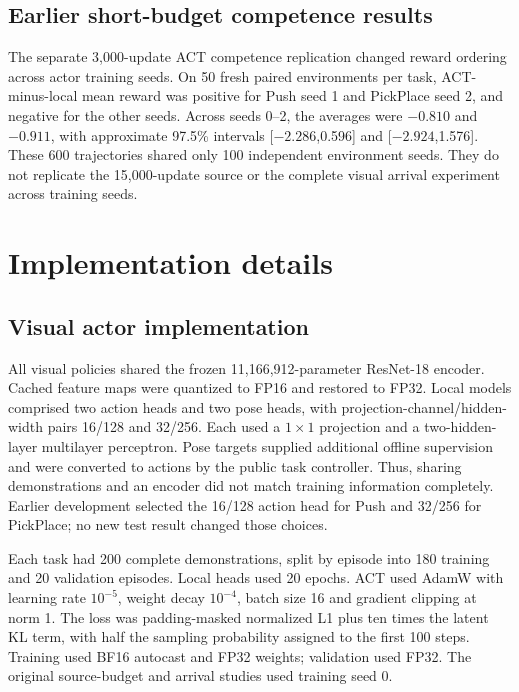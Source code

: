 \subsection{Earlier short-budget competence results}
The separate 3,000-update ACT competence replication changed reward ordering across actor training seeds. On 50 fresh paired environments per task, ACT-minus-local mean reward was positive for Push seed 1 and PickPlace seed 2, and negative for the other seeds. Across seeds 0--2, the averages were $-0.810$ and $-0.911$, with approximate 97.5\% intervals [$-2.286$,0.596] and [$-2.924$,1.576]. These 600 trajectories shared only 100 independent environment seeds. They do not replicate the 15,000-update source or the complete visual arrival experiment across training seeds.

\section{Implementation details}\label{s-app:implementation}
\subsection{Visual actor implementation}
All visual policies shared the frozen 11,166,912-parameter ResNet-18 encoder. Cached feature maps were quantized to FP16 and restored to FP32. Local models comprised two action heads and two pose heads, with projection-channel/hidden-width pairs 16/128 and 32/256. Each used a $1\times1$ projection and a two-hidden-layer multilayer perceptron. Pose targets supplied additional offline supervision and were converted to actions by the public task controller. Thus, sharing demonstrations and an encoder did not match training information completely. Earlier development selected the 16/128 action head for Push and 32/256 for PickPlace; no new test result changed those choices.

Each task had 200 complete demonstrations, split by episode into 180 training and 20 validation episodes. Local heads used 20 epochs. ACT used AdamW with learning rate $10^{-5}$, weight decay $10^{-4}$, batch size 16 and gradient clipping at norm 1. The loss was padding-masked normalized L1 plus ten times the latent KL term, with half the sampling probability assigned to the first 100 steps. Training used BF16 autocast and FP32 weights; validation used FP32. The original source-budget and arrival studies used training seed 0.



